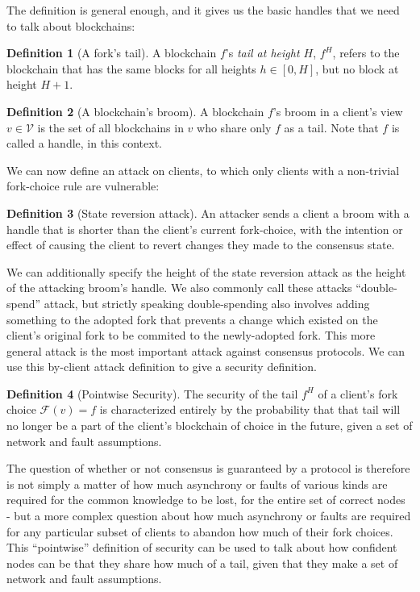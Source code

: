 \documentclass[11pt,a4paper]{article}
\theoremstyle{plain}
\theoremstyle{definition}
\newtheorem{defn}{Definition}
\begin{document}
The definition is general enough, and it gives us the basic handles that we need to talk about blockchains:

\begin{defn}[A fork's tail]
A blockchain $f$'s \emph{tail at height $H$}, $f^H$, refers to the blockchain that has the same blocks for all heights $h \in [0,H]$, but no block at height $H + 1$.
\end{defn}

\begin{defn}[A blockchain's broom]
A blockchain $f$'s broom in a client's view $v \in \mathcal{V}$ is the set of all blockchains in $v$ who share only $f$ as a tail. Note that $f$ is called a handle, in this context.
\end{defn}

We can now define an attack on clients, to which only clients with a non-trivial fork-choice rule are vulnerable:

\begin{defn}[State reversion attack]
An attacker sends a client a broom with a handle that is shorter than the client's current fork-choice, with the intention or effect of causing the client to revert changes they made to the consensus state.
\end{defn}

We can additionally specify the height of the state reversion attack as the height of the attacking broom's handle. We also commonly call these attacks ``double-spend'' attack, but strictly speaking double-spending also involves adding something to the adopted fork that prevents a change which existed on the client's original fork to be commited to the newly-adopted fork. This more general attack is the most important attack against consensus protocols. We can use this by-client attack definition to give a security definition.

\begin{defn}[Pointwise Security]
The security of the tail $f^H$ of a client's fork choice $\mathcal{F}(v) = f$ is characterized entirely by the probability that that tail will no longer be a part of the client's blockchain of choice in the future, given a set of network and fault assumptions. 
\end{defn}

The question of whether or not consensus is guaranteed by a protocol is therefore is not simply a matter of how much asynchrony or faults of various kinds are required for the common knowledge to be lost, for the entire set of correct nodes - but a more complex question about how much asynchrony or faults are required for any particular subset of clients to abandon how much of their fork choices. This ``pointwise'' definition of security can be used to talk about how confident nodes can be that they share how much of a tail, given that they make a set of network and fault assumptions. 
\end{document}
